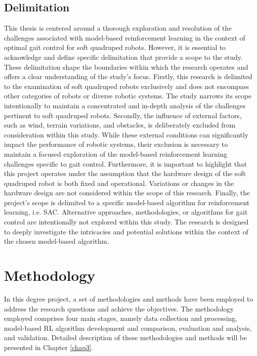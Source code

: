 \subsection*{Delimitation}
This thesis is centered around a thorough exploration and resolution of the challenges associated with model-based reinforcement learning in the context of optimal gait control for soft quadruped robots. However, it is essential to acknowledge and define specific delimitation that provide a scope to the study. These delimitation shape the boundaries within which the research operates and offers a clear understanding of the study's focus. Firstly, this research is delimited to the examination of soft quadruped robots exclusively and does not encompass other categories of robots or diverse robotic systems. The study narrows its scope intentionally to maintain a concentrated and in-depth analysis of the challenges pertinent to soft quadruped robots. Secondly, the influence of external factors, such as wind, terrain variations, and obstacles, is deliberately excluded from consideration within this study. While these external conditions can significantly impact the performance of robotic systems, their exclusion is necessary to maintain a focused exploration of the model-based reinforcement learning challenges specific to gait control. Furthermore, it is important to highlight that this project operates under the assumption that the hardware design of the soft quadruped robot is both fixed and operational. Variations or changes in the hardware design are not considered within the scope of this research. Finally, the project's scope is delimited to a specific model-based algorithm for reinforcement learning, i.e. \ac{SAC}. Alternative approaches, methodologies, or algorithms for gait control are intentionally not explored within this study. The research is designed to deeply investigate the intricacies and potential solutions within the context of the chosen model-based algorithm.

\section{Methodology}
In this degree project, a set of methodologies and methods have been employed to address the research questions and achieve the objectives. The methodology employed comprises four main stages, namely data collection and processing, model-based \ac{RL} algorithm development and comparison, evaluation and analysis, and validation. Detailed description of these methodologies and methods will be presented in Chapter \ref{chap3}. 

